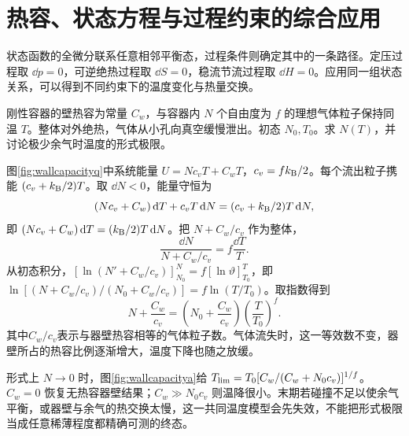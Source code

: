 \section{热容、状态方程与过程约束的综合应用}
状态函数的全微分联系任意相邻平衡态，过程条件则确定其中的一条路径。定压过程取 $\dd p=0$，可逆绝热过程取 $\dd S=0$，稳流节流过程取 $\dd H=0$。应用同一组状态关系，可以得到不同约束下的温度变化与热量交换。

\begin{example}[容器热容不可忽略的泄流冷却]
刚性容器的壁热容为常量 $C_w$，与容器内 $N$ 个自由度为 $f$ 的理想气体粒子保持同温 $T$。整体对外绝热，气体从小孔向真空缓慢泄出。初态 $N_0,T_0$。求 $N(T)$，并讨论极少余气时温度的形式极限。
\end{example}
\begin{solution}
图\ref{fig:wallcapacityq}中系统能量 $U=Nc_vT+C_wT$，$c_v=fk_{\mathrm B}/2$。每个流出粒子携能 $(c_v+k_{\mathrm B}/2)T$。取 $\dd N<0$，能量守恒为
\[
 (Nc_v+C_w)\mathop{}\!\mathrm d T+c_vT\mathop{}\!\mathrm d N
 =(c_v+k_{\mathrm B}/2)T\mathop{}\!\mathrm d N,
\]
即 $(Nc_v+C_w)\mathop{}\!\mathrm d T=(k_{\mathrm B}/2)T\mathop{}\!\mathrm d N$。把 $N+C_w/c_v$ 作为整体，
\[
 \frac{\dd N}{N+C_w/c_v}=f\frac{\dd T}T.
\]
从初态积分，$[\ln(N'+C_w/c_v)]_{N_0}^{N}=f[\ln\vartheta]_{T_0}^{T}$，即$\ln[(N+C_w/c_v)/(N_0+C_w/c_v)]=f\ln(T/T_0)$。取指数得到
\[
 N+\frac{C_w}{c_v}=\left(N_0+\frac{C_w}{c_v}\right)
 \left(\frac T{T_0}\right)^f.
\]
其中$C_w/c_v$表示与器壁热容相等的气体粒子数。气体流失时，这一等效数不变，器壁所占的热容比例逐渐增大，温度下降也随之放缓。

形式上 $N\to0$ 时，图\ref{fig:wallcapacitya}给 $T_{\rm lim}=T_0[C_w/(C_w+N_0c_v)]^{1/f}$。$C_w=0$ 恢复无热容器壁结果；$C_w\gg N_0c_v$ 则温降很小。末期若碰撞不足以使余气平衡，或器壁与余气的热交换太慢，这一共同温度模型会先失效，不能把形式极限当成任意稀薄程度都精确可测的终态。
\end{solution}

